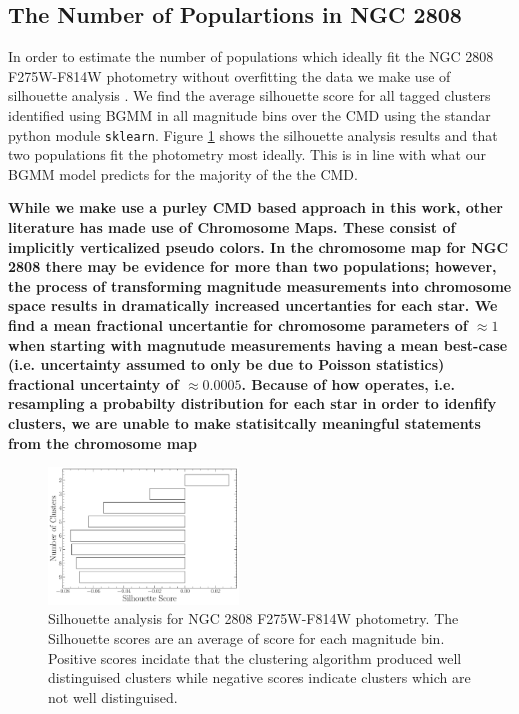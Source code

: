 \subsection{The Number of Populartions in NGC 2808}
In order to estimate the number of populations which ideally fit the NGC 2808
F275W-F814W photometry without overfitting the data we make use of silhouette
analysis \citep[][and in a similar manner to how \citet{Valle2022} preform
their analysis of spectroscopic data]{ROUSSEEUW198753}. We find the average
silhouette score for all tagged clusters identified using BGMM in all magnitude
bins over the CMD using the standar python module \texttt{sklearn}. Figure
\ref{fig:clusterAn} shows the silhouette analysis results and that two
populations fit the photometry most ideally. This is in line with what our BGMM
model predicts for the majority of the the CMD.

{\bf While we make use a purley CMD based approach in this work, other
literature has made use of Chromosome Maps. These consist of implicitly
verticalized pseudo colors. In the chromosome map for NGC 2808 there may be
evidence for more than two populations; however, the process of transforming
magnitude measurements into chromosome space results in dramatically increased
uncertanties for each star. We find a mean fractional uncertantie for
chromosome parameters of $\approx1$ when starting with magnutude
measurements having a mean best-case (i.e. uncertainty assumed to only be due
to Poisson statistics) fractional uncertainty of $\approx 0.0005$. Because of
how \fidanka operates, i.e. resampling a probabilty distribution for each star
in order to idenfify clusters, we are unable to make statisitcally meaningful
statements from the chromosome map}

\begin{figure}
  \centering
  \includegraphics[width=0.45\textwidth]{figures/ngc2808/ClusterAnalysis.pdf}
  \caption{Silhouette analysis for NGC 2808 F275W-F814W photometry. The Silhouette scores
  are an average of score for each magnitude bin. Positive scores incidate that the clustering
  algorithm produced well distinguised clusters while negative scores indicate clusters which are not
  well distinguised.}
  \label{fig:clusterAn}
\end{figure}



